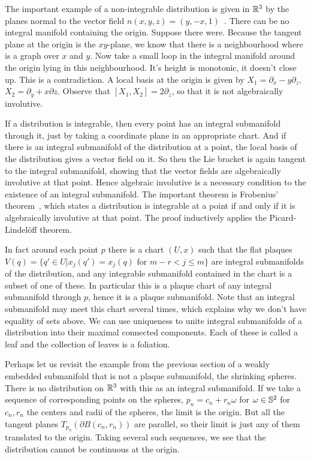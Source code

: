 The important example of a non-integrable distribution is given in $\mathbb{R}^3$ by the planes normal to the vector field $n(x,y,z)=(y,-x,1)$~\cite[Ex~2.3.1]{Sharpe1997}.
There can be no integral manifold containing the origin.
Suppose there were.
Because the tangent plane at the origin is the $xy$-plane, we know that there is a neighbourhood where is a graph over $x$ and $y$.
Now take a small loop in the integral manifold around the origin lying in this neighbourhood.
It's height is monotonic, it doesn't close up.
This is a contradiction.
A local basis at the origin is given by $X_1 = \partial_x - y \partial_z$, $X_2 = \partial_y + x\partial z$.
Observe that $[X_1,X_2] = 2\partial_z$, so that it is not algebraically involutive.


If a distribution is integrable, then every point has an integral submanifold through it, just by taking a coordinate plane in an appropriate chart.
And if there is an integral submanifold of the distribution at a point, the local basis of the distribution gives a vector field on it.
So then the Lie bracket is again tangent to the integral submanifold, showing that the vector fields are algebraically involutive at that point.
Hence algebraic involutive is a necessary condition to the existence of an integral submanifold.
The important theorem is Frobenius' theorem~\cite[2.4.1]{Sharpe1997}\cite[Thm~1.60]{Warner1983}, which states a distribution is integrable at a point if and only if it is algebraically involutive at that point.
The proof inductively applies the Picard-Lindelöff theorem.

In fact around each point $p$ there is a chart $(U,x)$ such that the flat plaques $V(q) = \{q' \in U | x_j(q') = x_j(q) \text{ for } m - r < j \leq m \}$ are integral submanifolds of the distribution, and any integrable submanifold contained in the chart is a subset of one of these.
In particular this is a plaque chart of any integral submanifold through $p$, hence it is a plaque submanifold.
Note that an integral submanifold may meet this chart several times, which explains why we don't have equality of sets above.
We can use uniqueness to unite integral submanifolds of a distribution into their maximal connected components.
Each of these is called a leaf and the collection of leaves is a foliation.

Perhaps let us revisit the example from the previous section of a weakly embedded submanifold that is not a plaque submanifold, the shrinking spheres.
There is no distribution on $\mathbb{R}^3$ with this as an integral submanifold. 
If we take a sequence of corresponding points on the spheres, $p_n = c_n + r_n \omega$ for $\omega \in \mathbb{S}^2$ for $c_n,r_n$ the centers and radii of the spheres, the limit is the origin. 
But all the tangent planes $T_{p_n}(\partial B(c_n,r_n))$ are parallel, so their limit is just any of them translated to the origin.
Taking several such sequences, we see that the distribution cannot be continuous at the origin.


